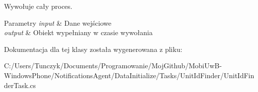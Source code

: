Wywołuje cały proces. 


\begin{DoxyParams}{Parametry}
{\em input} & Dane wejściowe\\
\hline
{\em output} & Obiekt wypełniany w czasie wywołania\\
\hline
\end{DoxyParams}


Dokumentacja dla tej klasy została wygenerowana z pliku\+:\begin{DoxyCompactItemize}
\item 
C\+:/\+Users/\+Tunczyk/\+Documents/\+Programowanie/\+Moj\+Github/\+Mobi\+Uw\+B-\/\+Windows\+Phone/\+Notifications\+Agent/\+Data\+Initialize/\+Tasks/\+Unit\+Id\+Finder/Unit\+Id\+Finder\+Task.\+cs\end{DoxyCompactItemize}
